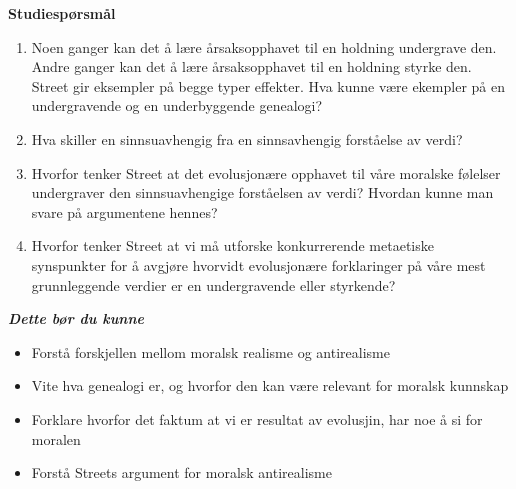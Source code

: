 \documentclass[11pt, a4paper]{article}
\newenvironment{sectionbox}[1][]{%
    \begin{sectionboxinner}
    \textbf{\large #1}
    \vspace{1pt}
    \newline
}{%
    \end{sectionboxinner}
}
\begin{document}
\begin{sectionbox}[Studiespørsmål]
\begin{enumerate}
    \item Noen ganger kan det å lære årsaksopphavet til en holdning undergrave den. Andre ganger kan det å lære årsaksopphavet til en holdning styrke den. Street gir eksempler på begge typer effekter. Hva kunne være ekempler på en undergravende og en underbyggende genealogi?
    \item Hva skiller en sinnsuavhengig fra en sinnsavhengig forståelse av verdi?
    \item Hvorfor tenker Street at det evolusjonære opphavet til våre moralske følelser undergraver den sinnsuavhengige forståelsen av verdi? Hvordan kunne man svare på argumentene hennes?
    \item Hvorfor tenker Street at vi må utforske konkurrerende metaetiske synspunkter for å avgjøre hvorvidt evolusjonære forklaringer på våre mest grunnleggende verdier er en undergravende eller styrkende?
\end{enumerate}

\textbf{\textit{Dette bør du kunne}}
\begin{itemize}
    \item Forstå forskjellen mellom moralsk realisme og antirealisme
    \item Vite hva genealogi er, og hvorfor den kan være relevant for moralsk kunnskap
    \item Forklare hvorfor det faktum at vi er resultat av evolusjin, har noe å si for moralen
    \item Forstå Streets argument for moralsk antirealisme
\end{itemize}
\end{sectionbox}
\end{document}
